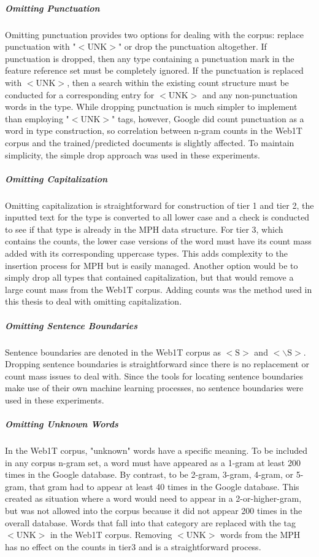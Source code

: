 			\subparagraph{Omitting Punctuation} Omitting punctuation provides two options for dealing with the corpus: replace punctuation with "$<\text{UNK}>$" or drop the punctuation altogether.  If punctuation is dropped, then any type containing a punctuation mark in the feature reference set must be completely ignored.  If the punctuation is replaced with $<\text{UNK}>$, then a search within the existing count structure must be conducted for a corresponding entry for $<\text{UNK}>$ and any non-punctuation words in the type.  While dropping punctuation is much simpler to implement than employing "$<\text{UNK}>$" tags, however, Google did count punctuation as a word in type construction, so correlation between n-gram counts in the Web1T corpus and the trained/predicted documents is slightly affected. To maintain simplicity, the simple drop approach was used in these experiments.
			\subparagraph{Omitting Capitalization} Omitting capitalization is straightforward for construction of tier 1 and tier 2, the inputted text for the type is converted to all lower case and a check is conducted to see if that type is already in the MPH data structure.  For tier 3, which contains the counts, the lower case versions of the word must have its count mass added with its corresponding uppercase types.  This adds complexity to the insertion process for MPH but is easily managed.  Another option would be to simply drop all types that contained capitalization, but that would remove a large count mass from the Web1T corpus.  Adding counts was the method used in this thesis to deal with omitting capitalization.
			\subparagraph{Omitting Sentence Boundaries}  Sentence boundaries are denoted in the Web1T corpus as $<\text{S}>$ and $<\backslash \text{S}>$. Dropping sentence boundaries is straightforward since there is no replacement or count mass issues to deal with.  Since the tools for locating sentence boundaries make use of their own machine learning processes, no sentence boundaries were used in these experiments.
			\subparagraph{Omitting Unknown Words} In the Web1T corpus, "unknown" words have a specific meaning.  To be included in any corpus n-gram set, a word must have appeared as a 1-gram at least 200 times in the Google database.  By contrast, to be 2-gram, 3-gram, 4-gram, or 5-gram, that gram had to appear at least 40 times in the Google database.  This created as situation where a word would need to appear in a 2-or-higher-gram, but was not allowed into the corpus because it did not appear 200 times in the overall database.  Words that fall into that category are replaced with the tag $<\text{UNK}>$ in the Web1T corpus.  Removing $<\text{UNK}>$ words from the MPH has no effect on the counts in tier3 and is a straightforward process.
		
